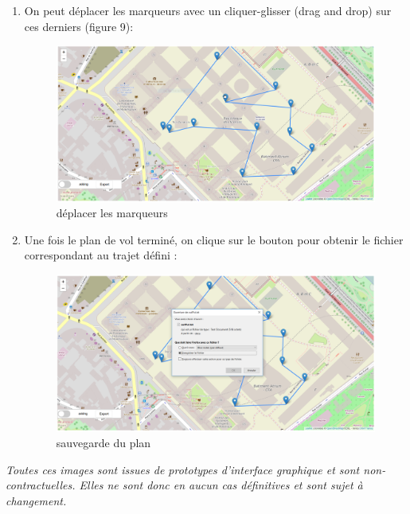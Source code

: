 \documentclass{article}
\begin{document}
\begin{enumerate}
 	\item On peut déplacer les marqueurs avec un cliquer-glisser (drag and drop) sur ces derniers (figure 9):
 	\begin{figure}[!h]
 	\begin{center}
 	\includegraphics[scale=0.42]{capt7.PNG}
 	\caption{déplacer les marqueurs}
 	\end{center}
 	\end{figure}
 	\newpage
  	\item Une fois le plan de vol terminé, on clique sur le bouton pour obtenir le fichier correspondant au trajet défini :
  	\begin{figure}[!h]
 	\begin{center}
 	\includegraphics[scale=0.42]{capt8.PNG}
 	\caption{sauvegarde du plan}
 	\end{center}
 	\end{figure}
 	\end{enumerate}
	\textit{Toutes ces images sont issues de prototypes d'interface graphique et sont non-contractuelles. Elles ne sont donc en aucun cas définitives et sont sujet à changement.}
\end{document}
